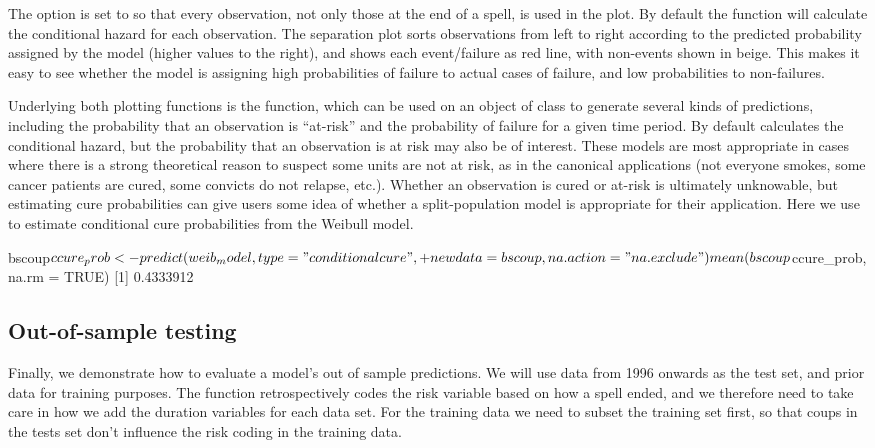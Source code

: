 The option  is set to  so that every
observation, not only those at the end of a spell, is used in the plot.
By default the  function will calculate the conditional
hazard for each observation. The separation plot sorts observations from
left to right according to the predicted probability assigned by the
model (higher values to the right), and shows each event/failure as red
line, with non-events shown in beige. This makes it easy to see whether
the model is assigning high probabilities of failure to actual cases of
failure, and low probabilities to non-failures.

Underlying both plotting functions is the  function, which
can be used on an object of class  to generate several kinds
of predictions, including the probability that an observation is
``at-risk'' and the probability of failure for a given time period. By default 
 calculates the conditional hazard, but the probability that an 
observation is at risk may also be of interest. These models 
are most appropriate in cases where there is a strong theoretical reason to suspect 
some units are not at risk, as in the canonical applications (not everyone smokes, 
some cancer patients are cured, some convicts do not relapse, etc.). Whether 
an observation is cured or at-risk is ultimately unknowable, but estimating cure probabilities 
can give users some idea of whether a split-population model is appropriate 
for their application. Here we use  to estimate conditional cure 
probabilities from the Weibull model. 

\begin{example}
  bscoup$ccure_prob <- predict(weib_model, type = "conditional cure", 
  +    newdata = bscoup, na.action = "na.exclude")
  mean(bscoup$ccure_prob, na.rm = TRUE)
  [1] 0.4333912
\end{example}

\subsection{Out-of-sample testing}

Finally, we demonstrate how to evaluate a model's out of sample
predictions. We will use data from 1996 onwards as the test set, and
prior data for training purposes. The  function
retrospectively codes the risk variable based on how a spell ended, and
we therefore need to take care in how we add the duration variables for
each data set. For the training data we need to subset the training set
first, so that coups in the tests set don't influence the risk coding in
the training data.

